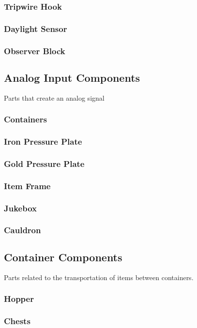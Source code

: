 \documentclass[12pt]{article}
\begin{document}
\subsubsection{Tripwire Hook}
\subsubsection{Daylight Sensor}
\subsubsection{Observer Block}

\pagebreak

\subsection{Analog Input Components}
Parts that create an analog signal 
\subsubsection{Containers}
\subsubsection{Iron Pressure Plate}
\subsubsection{Gold Pressure Plate}
\subsubsection{Item Frame}
\subsubsection{Jukebox}
\subsubsection{Cauldron}

\pagebreak

\subsection{Container Components}
Parts related to the transportation of items between containers.
\subsubsection{Hopper}
\subsubsection{Chests}
\end{document}
